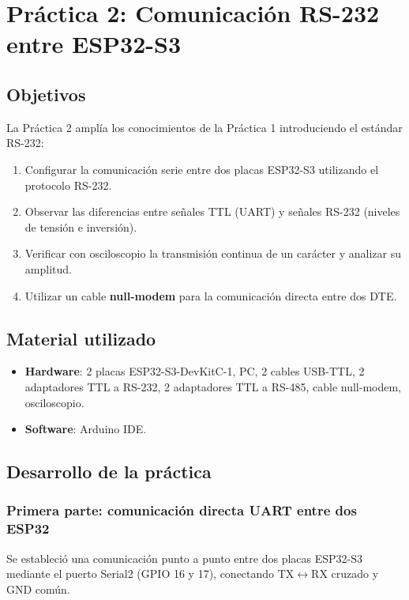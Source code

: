 \section{Práctica 2: Comunicación RS-232 entre ESP32-S3}
\label{sec:practica2}

\subsection{Objetivos}

La Práctica 2 amplía los conocimientos de la Práctica 1 introduciendo el estándar RS-232:
\begin{enumerate}
    \item Configurar la comunicación serie entre dos placas ESP32-S3 utilizando el protocolo RS-232.
    \item Observar las diferencias entre señales TTL (UART) y señales RS-232 (niveles de tensión e inversión).
    \item Verificar con osciloscopio la transmisión continua de un carácter y analizar su amplitud.
    \item Utilizar un cable \textbf{null-modem} para la comunicación directa entre dos DTE.
\end{enumerate}

\subsection{Material utilizado}

\begin{itemize}
    \item \textbf{Hardware}: 2 placas ESP32-S3-DevKitC-1, PC, 2 cables USB-TTL, 2 adaptadores TTL a RS-232, 2 adaptadores TTL a RS-485, cable null-modem, osciloscopio.
    \item \textbf{Software}: Arduino IDE.
\end{itemize}

\subsection{Desarrollo de la práctica}

\subsubsection{Primera parte: comunicación directa UART entre dos ESP32}

Se estableció una comunicación punto a punto entre dos placas ESP32-S3 mediante el puerto Serial2 (GPIO 16 y 17), conectando TX$\leftrightarrow$RX cruzado y GND común.

